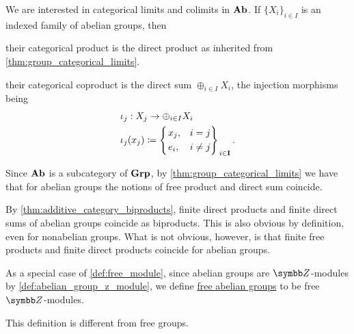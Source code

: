 \begin{proposition}\label{thm:abelian_group_categorical_limits}
  We are interested in categorical limits and colimits in $\operatorname{\mathbf{Ab}}$. If $\{ X_i \}_{i \in I}$ is an indexed family of abelian groups, then
  \begin{defenum}
    \item\label{thm:abelian_group_categorical_limits/product} their categorical product is the direct product as inherited from \cref{thm:group_categorical_limits}.

    \item\label{thm:abelian_group_categorical_limits/coproduct} their categorical coproduct is the direct sum $\oplus_{i \in I} X_i$, the injection morphisms being
    \begin{align*}
      &\iota_j: X_j \to \oplus_{i \in I} X_i \\
      &\iota_j(x_j) \coloneqq \begin{dcases}
        \begin{drcases}
          x_j, &i = j \\
          e_i, &i \neq j
        \end{drcases}
      \end{dcases}_{i \in \Bold I}.
    \end{align*}

    Since $\operatorname{\mathbf{Ab}}$ is a subcategory of $\operatorname{\mathbf{Grp}}$, by \cref{thm:group_categorical_limits} we have that for abelian groups the notions of free product and direct sum coincide.
  \end{defenum}
\end{proposition}

\begin{note}\label{note:abelian_group_biproducts}
  By \cref{thm:additive_category_biproducts}, finite direct products and finite direct sums of abelian groups coincide as biproducts. This is also obvious by definition, even for nonabelian groups. What is not obvious, however, is that finite free products and finite direct products coincide for abelian groups.
\end{note}

\begin{definition}\label{def:free_abelian_group}
  As a special case of \cref{def:free_module}, since abelian groups are $\BB{Z}$-modules by \cref{def:abelian_group_z_module}, we define \ul{free abelian groups} to be free $\BB{Z}$-modules.

  This definition is different from free groups.
\end{definition}
